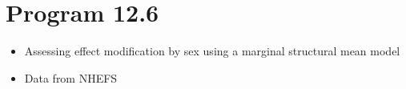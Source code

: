 \documentclass[
  10pt,
  a4paper,
]{book}
\newenvironment{Shaded}{\begin{snugshade}}{\end{snugshade}}
\newcommand{\DocumentationTok}[1]{\textcolor[rgb]{0.37,0.37,0.37}{\textit{#1}}}
\newcommand{\FunctionTok}[1]{\textcolor[rgb]{0.28,0.35,0.67}{#1}}
\newcommand{\NormalTok}[1]{\textcolor[rgb]{0.00,0.46,0.62}{#1}}
\newcommand{\SpecialCharTok}[1]{\textcolor[rgb]{0.37,0.37,0.37}{#1}}
\providecommand{\tightlist}{%
  \setlength{\itemsep}{0pt}\setlength{\parskip}{0pt}}
\begin{document}
\section{Program 12.6}\label{program-12.6}

\begin{itemize}
\tightlist
\item
  Assessing effect modification by sex using a marginal structural mean model
\item
  Data from NHEFS
\end{itemize}

\begin{Shaded}
\end{Shaded}
\end{document}
